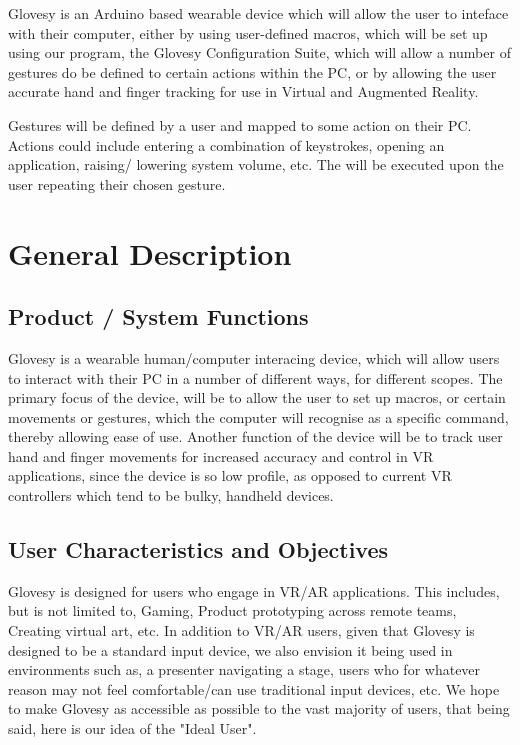 \documentclass[12pt,a4paper,oneside]{book}
\theoremstyle{plain}
\numberwithin{equation}{chapter}
\newcounter{Chapnum}
\newcounter{Secnum}
\begin{document}
\noindent Glovesy is an Arduino based wearable device which will allow the user to inteface with their computer, either by using user-defined macros, which will be set up using our program, the Glovesy Configuration Suite, which will allow a number of gestures do be defined to certain actions within the PC, or by allowing the user accurate hand and finger tracking for use in Virtual and Augmented Reality.

\vspace{1cm}

\noindent Gestures will be defined by a user and mapped to some action on their PC. Actions could include entering a combination of keystrokes, opening an application, raising/ lowering system volume, etc. The will be executed upon the user repeating their chosen gesture.

\vspace{1cm}


\chapter*{General Description}

\section{Product / System Functions}

\noindent Glovesy is a wearable human/computer interacing device, which will allow users to interact with their PC in a number of different ways, for different scopes.  The primary focus of the device, will be to allow the user to set up macros, or certain movements or gestures, which the computer will recognise as a specific command, thereby allowing ease of use. Another function of the device will be to track user hand and finger movements for increased accuracy and control in VR applications, since the device is so low profile, as opposed to current VR controllers which tend to be bulky, handheld devices.

\section{User Characteristics and Objectives}

\noindent Glovesy is designed for users who engage in VR/AR applications. This includes, but is not limited to, Gaming, Product prototyping across remote teams,  Creating virtual art, etc. In addition to VR/AR users, given that Glovesy is designed to be a standard input device, we also envision it being used in environments such as,  a presenter navigating a stage, users who for whatever reason may not feel comfortable/can use traditional input devices, etc. We hope to make Glovesy as accessible as possible to the vast majority of users, that being said, here is our idea of the "Ideal User".
\end{document}
